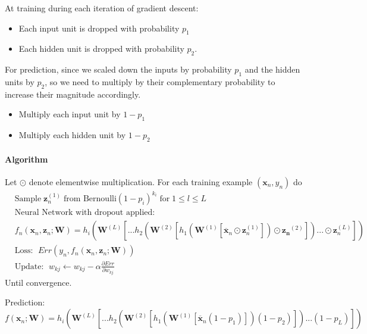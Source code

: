 \documentclass[12pt]{article}
\begin{document}
            At training during each iteration of gradient descent:
            \begin{itemize}
                \item Each input unit is dropped with probability $p_1$
                \item Each hidden unit is dropped with probability $p_2$.
            \end{itemize}

            For prediction, since we scaled down the inputs by probability $p_1$ and the hidden units by $p_2$, so we need to
            multiply by their complementary probability to increase their magnitude accordingly.
            \begin{itemize}
                \item Multiply each input unit by $1 - p_1$
                \item Multiply each hidden unit by $1 - p_2$
            \end{itemize}

            \paragraph{Algorithm}
            Let $\odot$ denote elementwise multiplication.
            For each training example $(\boldsymbol{x}_n, y_n)$ do
            \begin{align*}
                & \text{Sample} \; \boldsymbol{z}_n^{(1)} \; \text{from Bernoulli} (1 - p_i)^{k_i} \; \text{for} \; 1 \leq l \leq L \\
                & \text{Neural Network with dropout applied: } \\ 
                & f_n(\boldsymbol{x}_n, \boldsymbol{z}_n; \boldsymbol{W}) = h_i(\boldsymbol{W}^{(L)} [...h_2(\boldsymbol{W}^{(2)}[h_1(\boldsymbol{W}^{(1)}[\overline{\boldsymbol{x}}_n \odot \boldsymbol{z}_n^{(1)}])\odot \boldsymbol{z_n}^{(2)}])... \odot \boldsymbol{z}_n^{(L)}]) \\
                & \text{Loss: } \; Err(y_n, f_n(\boldsymbol{x}_n, \boldsymbol{z}_n; \boldsymbol{W})) \\
                & \text{Update: } \; w_{kj} \leftarrow w_{kj} - \alpha \frac{\partial Err}{\partial w_{kj}}
            \end{align*}
            Until convergence.

            Prediction:
            $$ f(\boldsymbol{x}_n; \boldsymbol{W}) = h_i(\boldsymbol{W}^{(L)}
            [...h_2(\boldsymbol{W}^{(2)}[h_1(\boldsymbol{W}^{(1)}[\overline{\boldsymbol{x}}_n (1-p_1)])(1-p_2)])...
            (1-p_L)]) $$        
        
\end{document}
